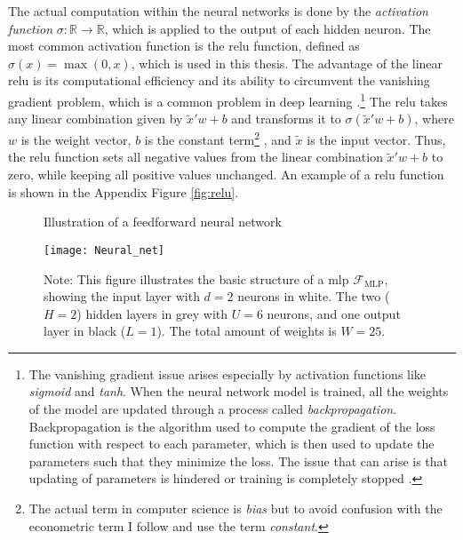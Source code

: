 The actual computation within the neural networks is done by the \textit{activation function} $ \sigma : \mathbb{R} \to \mathbb{R} $, which is applied to the output of each hidden neuron.
The most common activation function is the \ac{relu} function, defined as $ \sigma(x) = \max(0, x) $, which is used in this thesis.
The advantage of the linear \ac{relu} is its computational efficiency and its ability to circumvent the vanishing gradient problem, which is a common problem in deep learning \citep{10.1214/19-AOS1875}.\footnote[1]{The vanishing gradient issue arises especially by activation functions like \textit{sigmoid} and \textit{tanh}.
When the neural network model is trained, all the weights of the model are updated through a process called \textit{backpropagation}.
Backpropagation is the algorithm used to compute the gradient of the loss function with respect to each parameter, which is then used to update the parameters such that they minimize the loss.
The issue that can arise is that updating of parameters is hindered or training is completely stopped \citep{abuqaddom2021oriented}.}
The \ac{relu} takes any linear combination given by $\tilde{x}' w + b$ and transforms it to $ \sigma(\tilde{x}' w + b)$, where $w$ is the weight vector, $b$ is the constant term\footnote[2]{The actual term in computer science is \textit{bias} but to avoid confusion with the econometric term I follow \citet{farrellDeepNeuralNetworks2021} and use the term \textit{constant}.}
, and $\tilde{x}$ is the input vector.
Thus, the \ac{relu} function sets all negative values from the linear combination $\tilde{x}' w + b$ to zero, while keeping all positive values unchanged.
An example of a \ac{relu} function is shown in the Appendix Figure \ref{fig:relu}.
\begin{figure}%
\centering
\caption{Illustration of a feedforward neural network \citep{farrellDeepNeuralNetworks2021}}
\texttt{[image: Neural\_net]}
\caption*{Note: This figure illustrates the basic structure of a \ac{mlp} $\mathcal{F}_{\text{MLP}}$, showing the input layer with $d=2$ neurons in white. The two ($H=2$) hidden layers in grey with $U=6$ neurons, and one output layer in black ($L=1$). The total amount of weights is $W=25$.}
\label{fig:1}
\end{figure}


